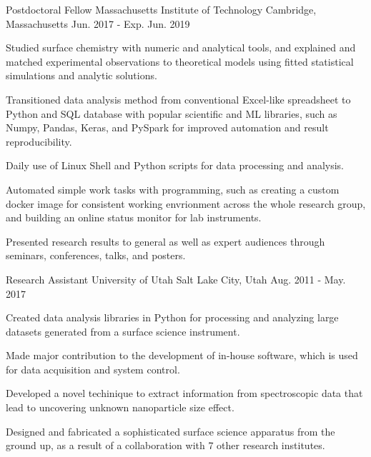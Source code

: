 


\begin{cventries}


\cventry
{Postdoctoral Fellow}
{Massachusetts Institute of Technology}
{Cambridge, Massachusetts}
{Jun. 2017 - Exp. Jun. 2019}
{
\begin{cvitems}
\item {Studied surface chemistry with numeric and analytical tools, and
    explained and matched experimental observations to theoretical models
    using fitted statistical simulations and analytic solutions.}
\item {Transitioned data analysis method from conventional Excel-like
    spreadsheet to Python and SQL database with popular scientific and ML libraries,
    such as Numpy, Pandas, Keras, and PySpark for improved automation and result
    reproducibility.}
\item {Daily use of Linux Shell and Python scripts for data processing and analysis.}
\item {Automated simple work tasks with programming, such as creating a custom
    docker image for consistent working envrionment across the whole research group, and
    building an online status monitor for lab instruments.}
\item {Presented research results to general as well as expert audiences
    through seminars, conferences, talks, and posters.}
\end{cvitems}
}


\cventry
{Research Assistant}
{University of Utah}
{Salt Lake City, Utah}
{Aug. 2011 - May. 2017}
{
\begin{cvitems}
\item {Created data analysis libraries in Python for processing and analyzing
    large datasets generated from a surface science instrument.}
\item {Made major contribution to the development of in-house software, which is used
    for data acquisition and system control.}
\item {Developed a novel techinique to extract information from spectroscopic
    data that lead to uncovering unknown nanoparticle size effect.}
\item {Designed and fabricated a sophisticated surface science apparatus from
    the ground up, as a result of a collaboration with 7 other research institutes.}
\end{cvitems}
}


\end{cventries}